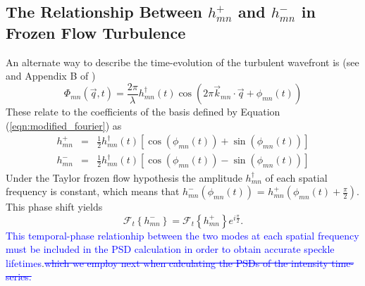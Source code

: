\documentclass[10pt,preprint]{aastex631}
\newcommand{\jrmadd}[1]{\textcolor{blue}{#1}}
\newcommand{\jrmrmv}[1]{\textcolor{blue}{\sout{#1}}}
\begin{document}
\subsection{The Relationship Between $h_{mn}^+$ and $h_{mn}^-$ in Frozen Flow Turbulence}

An alternate way to describe the time-evolution of the turbulent wavefront is (see \citet{2005ApJ...629..592G} and Appendix B of \citet{2018JATIS...4a9001M})
\begin{equation}
\Phi_{mn}(\vec{q},t) = \frac{2\pi}{\lambda} h_{mn}^\dagger(t) \cos \left( 2\pi \vec{k}_{mn} \cdot \vec{q} + \phi_{mn}(t) \right)
\end{equation}
These relate to the coefficients of the basis defined by Equation (\ref{eqn:modified_fourier}) as
\begin{eqnarray}
h_{mn}^+ &=& \frac{1}{2} h_{mn}^\dagger(t) \left[ \cos(\phi_{mn}(t)) + \sin(\phi_{mn}(t))\right] \\
h_{mn}^- &=& \frac{1}{2} h_{mn}^\dagger(t) \left[ \cos(\phi_{mn}(t)) - \sin(\phi_{mn}(t))\right] \nonumber
\end{eqnarray}
Under the Taylor frozen flow hypothesis the amplitude $h_{mn}^\dagger$ of each spatial frequency is constant, which means that $h_{mn}^-(\phi_{mn}(t))$ = $h_{mn}^+(\phi_{mn}(t) + \frac{\pi}{2})$.  This phase shift yields
\begin{equation}
\mathcal{F}_t\left\{h_{mn}^-\right\} = \mathcal{F}_t\left\{h_{mn}^+\right\} e^{i\frac{\pi}{2}}.
\end{equation}
\jrmadd{This temporal-phase relationhip between the two modes at each spatial frequency must be included in the PSD calculation in order to obtain accurate speckle lifetimes}.\jrmrmv{which we employ next when calculating the PSDs of the intensity time-series.}
\end{document}
